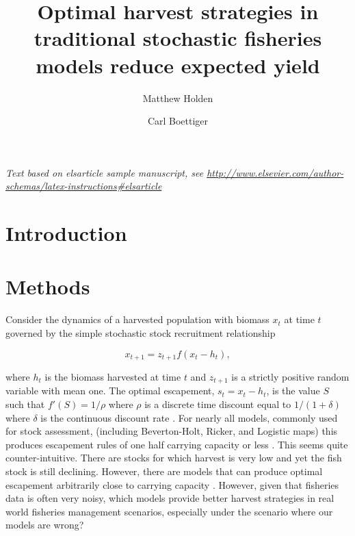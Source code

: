 \documentclass[]{elsarticle} %
\begin{document}
\begin{frontmatter}

  \title{Optimal harvest strategies in traditional stochastic fisheries models reduce expected yield}
    \author[CEED,UQ]{Matthew Holden}
    \author[UCB]{Carl Boettiger}
	\address[CEED]{ARC Centre of Excellence for Environmental Decisions, University of
		Queensland, Brisbane, QLD, 4072, Australia}
    \address[UQ]{Centre for Biodiversity and Conservation Science, University of Queensland, School of Biology, Brisbane, QLD, 4072, Australia}
    \address[UCB]{University of California Berkeley}
  
  \begin{abstract}

  \end{abstract}
  
 \end{frontmatter}

\emph{Text based on elsarticle sample manuscript, see
\url{http://www.elsevier.com/author-schemas/latex-instructions\#elsarticle}}

\section{Introduction}
\section{Methods}
Consider the dynamics of a harvested population with biomass $x_t$ at time $t$ governed by the simple stochastic stock recruitment relationship

\begin{equation}
x_{t+1} = z_{t+1}f(x_t  - h_t),
\end{equation}

where $h_t$ is the biomass harvested at time $t$ and $z_{t+1}$ is a strictly positive random variable with mean one. The optimal escapement, $s_t = x_t  - h_t$, is the value $S$ such that $f'(S)=1/\rho$ where $\rho$ is a discrete time discount equal to $1/(1+\delta)$ where $\delta$ is the continuous discount rate \cite{Reed1979}. For nearly all models, commonly used for stock assessment, (including Beverton-Holt, Ricker, and Logistic maps) this produces escapement rules of one half carrying capacity or less \cite{Reed1979,Clark2010}. This seems quite counter-intuitive. There are stocks for which harvest is very low and yet the fish stock is still declining. However, there are models that can produce optimal escapement arbitrarily close to carrying capacity \cite{pella1969}. However, given that fisheries data is often very noisy, which models provide better harvest strategies in real world fisheries management scenarios, especially under the scenario where our models are wrong? 
\end{document}
